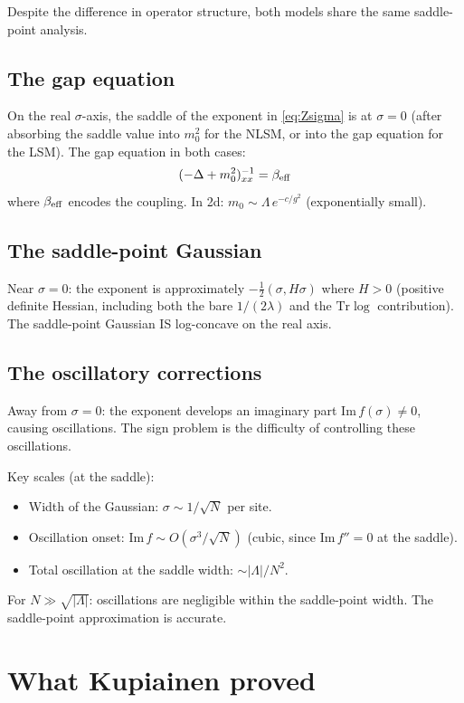 \documentclass[12pt]{article}
\theoremstyle{definition}
\theoremstyle{remark}
\newcommand{\Tr}{\mathrm{Tr}}
\newcommand{\La}{\Lambda}
\begin{document}
Despite the difference in operator structure, both models share
the same saddle-point analysis.

\subsection{The gap equation}

On the real $\sigma$-axis, the saddle of the exponent in
\eqref{eq:Zsigma} is at $\sigma = 0$ (after absorbing the saddle
value into $m_0^2$ for the NLSM, or into the gap equation for the LSM).
The gap equation in both cases:
\begin{equation}
  (-\Delta+m_0^2)^{-1}_{xx} = \beta_{\rm eff}
\end{equation}
where $\beta_{\rm eff}$ encodes the coupling. In 2d:
$m_0 \sim \La\,e^{-c/g^2}$ (exponentially small).

\subsection{The saddle-point Gaussian}

Near $\sigma = 0$: the exponent is approximately
$-\tfrac{1}{2}(\sigma, H\sigma)$ where $H > 0$ (positive definite
Hessian, including both the bare $1/(2\lambda)$ and the $\Tr\log$
contribution). The saddle-point Gaussian IS log-concave on the
real axis.

\subsection{The oscillatory corrections}

Away from $\sigma = 0$: the exponent develops an imaginary part
$\mathrm{Im}\,f(\sigma) \ne 0$, causing oscillations. The sign problem
is the difficulty of controlling these oscillations.

Key scales (at the saddle):
\begin{itemize}
\item Width of the Gaussian: $\sigma \sim 1/\sqrt{N}$ per site.
\item Oscillation onset: $\mathrm{Im}\,f \sim O(\sigma^3/\sqrt{N})$
  (cubic, since $\mathrm{Im}\,f'' = 0$ at the saddle).
\item Total oscillation at the saddle width: $\sim |\La|/N^2$.
\end{itemize}
For $N \gg \sqrt{|\La|}$: oscillations are negligible within the
saddle-point width. The saddle-point approximation is accurate.

\section{What Kupiainen proved}
\end{document}
